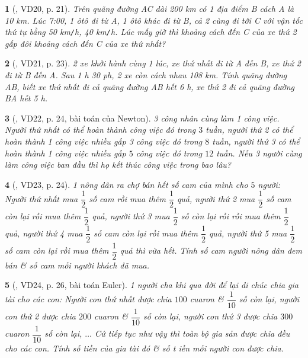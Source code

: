\documentclass{article}
\newtheorem{baitoan}{}
\begin{document}
\begin{baitoan}[\cite{Binh_Toan_6_tap_2}, VD20, p. 21]
	Trên quãng đường AC dài {\rm200 km} có 1 địa điểm B cách A là {\rm10 km}. Lúc {\rm7:00}, 1 ôtô đi từ A, 1 ôtô khác đi từ B, cả 2 cùng đi tới C với vận tốc thứ tự bằng {\rm50 km{\tt/}h, 40 km{\tt/}h}. Lúc mấy giờ thì khoảng cách đến C của xe thứ 2 gấp đôi khoảng cách đến C của xe thứ nhất?
\end{baitoan}

\begin{baitoan}[\cite{Binh_Toan_6_tap_2}, VD21, p. 23]
	2 xe khởi hành cùng 1 lúc, xe thứ nhất đi từ A đến B, xe thứ 2 đi từ B đến A. Sau {\rm1 h 30 ph}, 2 xe còn cách nhau {\rm108 km}. Tính quãng đường AB, biết xe thứ nhất đi cả quãng đường AB hết {\rm6 h}, xe thứ 2 đi cả quãng đường BA hết {\rm5 h}.
\end{baitoan}

\begin{baitoan}[\cite{Binh_Toan_6_tap_2}, VD22, p. 24, bài toán của Newton]
	3 công nhân cùng làm 1 công việc. Người thứ nhất có thể hoàn thành công việc đó trong $3$ tuần, người thứ 2 có thể hoàn thành 1 công việc nhiều gấp 3 công việc đó trong $8$ tuần, người thứ 3 có thể hoàn thành 1 công việc nhiều gấp $5$ công việc đó trong $12$ tuần. Nếu 3 người cùng làm công việc ban đầu thì họ kết thúc công việc trong bao lâu?
\end{baitoan}

\begin{baitoan}[\cite{Binh_Toan_6_tap_2}, VD23, p. 24]
	1 nông dân ra chợ bán hết số cam của mình cho $5$ người: Người thứ nhất mua $\dfrac{1}{2}$ số cam rồi mua thêm $\dfrac{1}{2}$ quả, người thứ 2 mua $\dfrac{1}{2}$ số cam còn lại rồi mua thêm $\dfrac{1}{2}$ quả, người thứ 3 mua $\dfrac{1}{2}$ số còn lại rồi rồi mua thêm $\dfrac{1}{2}$ quả, người thứ 4 mua $\dfrac{1}{2}$ số cam còn lại rồi mua thêm $\dfrac{1}{2}$ quả, người thứ 5 mua $\dfrac{1}{2}$ số cam còn lại rồi mua thêm $\dfrac{1}{2}$ quả thì vừa hết. Tính số cam người nông dân đem bán \& số cam mỗi người khách đã mua.
\end{baitoan}

\begin{baitoan}[\cite{Binh_Toan_6_tap_2}, VD24, p. 26, bài toán Euler]
	1 người cha khi qua đời để lại di chúc chia gia tài cho các con: Người con thứ nhất được chia $100$ cuaron \& $\dfrac{1}{10}$ số còn lại, người con thứ 2  được chia $200$ cuaron \& $\dfrac{1}{10}$ số còn lại, người con thứ 3 được chia $300$ cuaron $\dfrac{1}{10}$ số còn lại, $\ldots$ Cứ tiếp tục như vậy thì toàn bộ gia sản được chia đều cho các con. Tính số tiền của gia tài đó \& số t iền mỗi người con được chia.
\end{baitoan}
\end{document}
